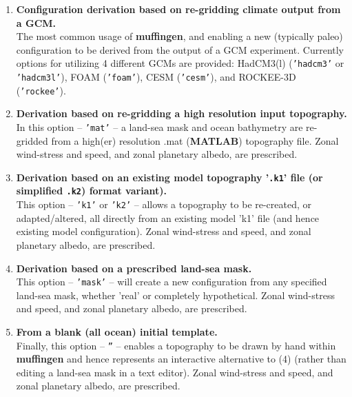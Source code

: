 \documentclass[11pt,fleqn]{book} %
\begin{document}
\begin{enumerate}[noitemsep]
\setlength{\itemindent}{.2in}
\setcounter{enumi}{0}
\vspace{1mm}
\item \textbf{Configuration derivation based on re-gridding climate output from a GCM.}
\\ The most common usage of \textbf{muffingen}, and enabling a new (typically paleo) configuration to be derived from the output of a GCM experiment. Currently options for utilizing 4 different GCMs are provided: HadCM3(l) (\texttt{'hadcm3'} or \texttt{'hadcm3l'}), FOAM (\texttt{'foam'}), CESM (\texttt{'cesm'}), and ROCKEE-3D (\texttt{'rockee'}).
\vspace{1mm}
\item \textbf{Derivation based on re-gridding a high resolution input topography.}
\\ In this option -- \texttt{'mat'} -- a land-sea mask and ocean bathymetry are re-gridded from a high(er) resolution \textsf{\footnotesize .mat} (\textbf{MATLAB}) topography file. Zonal wind-stress and speed, and zonal planetary albedo, are prescribed.
\vspace{1mm}
\item \textbf{Derivation based on an existing model topography '\texttt{.k1}' file (or simplified \texttt{.k2}) format variant).}
\\ This option -- \texttt{'k1'} or \texttt{'k2'} -- allows a topography to be re-created, or adapted/altered, all directly from an existing model 'k1' file (and hence existing model configuration). Zonal wind-stress and speed, and zonal planetary albedo, are prescribed.
\vspace{1mm}
\item \textbf{Derivation based on a prescribed land-sea mask.}
\\ This option -- \texttt{'mask'} -- will create a new configuration from any specified land-sea mask, whether 'real' or completely hypothetical. Zonal wind-stress and speed, and zonal planetary albedo, are prescribed.
\vspace{1mm}
\item \textbf{From a blank (all ocean) initial template.}
\\ Finally, this option -- \texttt{''} -- enables a topography to be drawn by hand within \textbf{muffingen} and hence represents an interactive alternative to (4) (rather than editing a land-sea mask in a text editor). Zonal wind-stress and speed, and zonal planetary albedo, are prescribed.
\end{enumerate}
\end{document}
